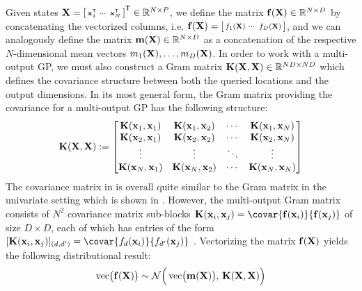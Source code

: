 \documentclass[10pt]{article}
\numberwithin{equation}{section}
\DeclareMathOperator{\vect}{vec}
\begin{document}
Given states $\mathbf{X} = \begin{bsmallmatrix} \mathbf{x}_{1}^{\scriptscriptstyle{\mathsf{T}}} & \cdots & \mathbf{x}_{N}^{\scriptscriptstyle{\mathsf{T}}} \end{bsmallmatrix}^{\scriptstyle{\mathsf{T}}} \in \mathbb{R}^{N \times P}$, we define the matrix $\mathbf{f}(\mathbf{X}) \in \mathbb{R}^{N \times D}$ by concatenating the vectorized columns, i.e. $\mathbf{f}(\mathbf{X}) = \begin{bsmallmatrix}f_{1}(\mathbf{X}) & \cdots & f_{D}(\mathbf{X})\end{bsmallmatrix}$, and we can analogously define the matrix $\mathbf{m}(\mathbf{X}) \in \mathbb{R}^{N \times D}$ as a concatenation of the respective $N$-dimensional mean vectors $m_{1}(\mathbf{X}), \dots, m_{D}(\mathbf{X})$. In order to work with a multi-output GP, we must also construct a Gram matrix $\mathbf{K}(\mathbf{X}, \mathbf{X}) \in \mathbb{R}^{ND \times ND}$ which defines the covariance structure between both the queried locations and the output dimensions. In its most general form, the Gram matrix providing the covariance for a multi-output GP has the following structure:
\begin{equation}
\label{eq:MOGP-gram-matrix}
    \mathbf{K}(\mathbf{X}, \mathbf{X}) := \begin{bmatrix}
        \mathbf{K}(\mathbf{x}_{1}, \mathbf{x}_{1}) & \mathbf{K}(\mathbf{x}_{1}, \mathbf{x}_{2}) & \cdots & \mathbf{K}(\mathbf{x}_{1}, \mathbf{x}_{N})\\
        \mathbf{K}(\mathbf{x}_{2}, \mathbf{x}_{1}) & \mathbf{K}(\mathbf{x}_{2}, \mathbf{x}_{2}) & \cdots & \mathbf{K}(\mathbf{x}_{2}, \mathbf{x}_{N})\\
        \vdots & \vdots & \ddots & \vdots\\
        \mathbf{K}(\mathbf{x}_{N}, \mathbf{x}_{1}) & \mathbf{K}(\mathbf{x}_{N}, \mathbf{x}_{2}) & \cdots & \mathbf{K}(\mathbf{x}_{N}, \mathbf{x}_{N})
    \end{bmatrix}
\end{equation}
The covariance matrix in  is overall quite similar to the Gram matrix in the univariate setting which is shown in . However, the multi-output Gram matrix consists of $N^{2}$ covariance matrix sub-blocks $\bfK(\bfx_{i}, \bfx_{j}) = \covar{\bff(\bfx_{i})}{\bff(\bfx_{j})}$ of size $D \times D$, each of which has entries of the form $[\bfK(\bfx_{i}, \bfx_{j})]_{(d,d')} = \covar{f_{d}(\bfx_{i})}{f_{d'}(\bfx_{j})}$ \citep{Alvarez-Vector-Kernels-2012}. Vectorizing the matrix $\mathbf{f}(\mathbf{X})$ yields the following distributional result:
\begin{equation}
\label{eq:MOGP-fun-distribution}
    \vect\!\big(\bff(\bfX)\big) \sim \calN\Big(\vect\!\big(\bfm(\bfX)\big),\, \bfK(\bfX, \bfX)\Big)
\end{equation}
\end{document}
